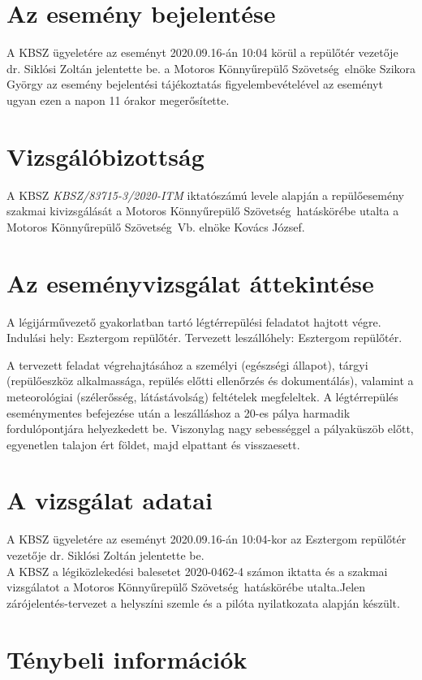 \documentclass[a4paper,10pt]{article}
\newcommand{\mksz}{Motoros Könnyűrepülő Szövetség\ }
\begin{document}
\section*{Az esemény bejelentése}
A KBSZ ügyeletére az eseményt 2020.09.16-án 10:04 körül a repülőtér vezetője 
dr. Siklósi Zoltán jelentette be. a \mksz  elnöke Szikora György az esemény 
bejelentési tájékoztatás figyelembevételével az eseményt ugyan ezen a napon 11 
órakor megerősítette.

\section*{Vizsgálóbizottság}
A KBSZ \textit{KBSZ/83715-3/2020-ITM} iktatószámú levele alapján a 
repülőesemény szakmai kivizsgálását a \mksz hatáskörébe utalta a \mksz Vb. 
elnöke Kovács József.

\section*{Az eseményvizsgálat áttekintése}
A légijárművezető gyakorlatban tartó légtérrepülési feladatot hajtott végre.
Indulási hely: Esztergom repülőtér. Tervezett leszállóhely: Esztergom repülőtér.

A tervezett feladat végrehajtásához a személyi (egészségi állapot), tárgyi 
(repülőeszköz alkalmassága, repülés előtti ellenőrzés és dokumentálás), 
valamint a meteorológiai (szélerősség, látástávolság) feltételek megfeleltek. 
A légtérrepülés eseménymentes befejezése után a leszálláshoz a 20-es pálya 
harmadik fordulópontjára helyezkedett be. Viszonylag nagy sebességgel a 
pályaküszöb előtt, egyenetlen talajon ért földet, majd elpattant és visszaesett.

\section*{A vizsgálat adatai}
A KBSZ ügyeletére az eseményt 2020.09.16-án 10:04-kor az Esztergom repülőtér 
vezetője dr. Siklósi Zoltán jelentette be.
\\

A KBSZ a légiközlekedési balesetet 2020-0462-4 számon iktatta és a szakmai 
vizsgálatot a \mksz hatáskörébe utalta.Jelen zárójelentés-tervezet a helyszíni 
szemle és a pilóta nyilatkozata alapján készült.

\section{Ténybeli információk}
\end{document}
